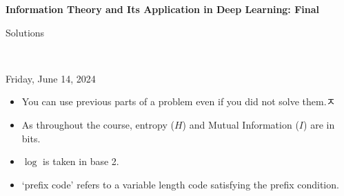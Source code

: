 \documentclass[12pt]{article}
\begin{document}
\begin{center}
{\bf Information Theory and Its Application in Deep Learning: Final\begin{solution}Solutions\end{solution}} \\ \medskip
\begin{problem}Friday, June 14, 2024 \end{problem}
\end{center}

\begin{problem}
\noindent 
\begin{itemize}
\item You can use previous parts of a problem even if you did not solve them.ㅈ
\item As throughout the course, entropy ($H$) and Mutual Information ($I$) are in bits.
\item $\log$ is taken in base 2. 
\item `prefix code' refers to a variable length code satisfying the prefix condition.  
\end{itemize}
\end{problem}

\begin{solution}
\end{solution}

\end{document}
